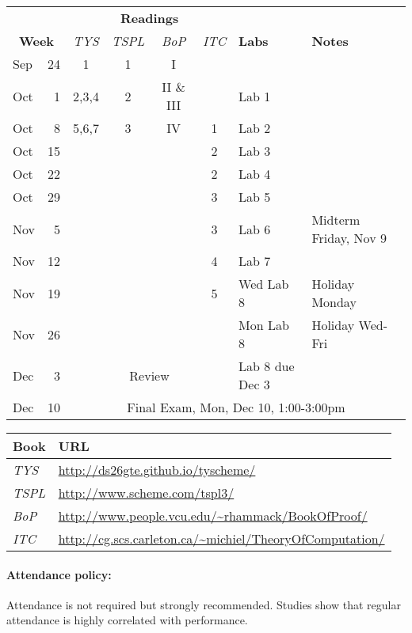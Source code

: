 \documentclass{article}
\begin{document}
  \begin{center}
\begin{tabular}{lr|cccc|l|l}                      
& & \multicolumn{4}{c|}{\bf Readings} &  \\
  \multicolumn{2}{c|}{\bf Week} &\em TYS & \em TSPL &\em BoP&\em ITC
& {\bf Labs}  & {\bf Notes} \\\hline  
Sep & 24  & 1 & 1 & I   & &  \\
Oct & 1 & 2,3,4 & 2 & II \& III &   &Lab 1 &\\
Oct & 8 & 5,6,7 & 3 & IV  & 1 & Lab 2&\\
Oct & 15 &  &   &    & 2 & Lab 3&\\
Oct & 22 &  &   &     & 2 & Lab 4&\\
Oct & 29 &  &   &     & 3 & Lab 5&\\
Nov & 5 &  &   &     & 3 & Lab 6 &Midterm Friday, Nov 9\\
Nov & 12 &  &   &     & 4 & Lab 7&\\
Nov & 19 &  &   &     & 5 & Wed Lab 8& Holiday Monday\\
Nov & 26 &  &  &      &  &Mon Lab 8& Holiday Wed-Fri \\                 
Dec & 3   &  \multicolumn{4}{c|}{Review}  &Lab 8 due Dec 3&\\ \hline
Dec & 10  &  \multicolumn{6}{|c}{Final Exam, Mon, Dec 10, 1:00-3:00pm} \\
\end{tabular}

\begin{tabular}{ll}
Book & URL\\\hline
{\em TYS} &       \url{http://ds26gte.github.io/tyscheme/} \\
{\em TSPL} & \url{http://www.scheme.com/tspl3/} \\
{\em BoP} & \url{http://www.people.vcu.edu/~rhammack/BookOfProof/}\\
{\em ITC} & \url{http://cg.scs.carleton.ca/~michiel/TheoryOfComputation/}\\
\end{tabular}

\end{center}

\paragraph{Attendance policy:} Attendance is not required but strongly
  recommended.  Studies show that regular attendance is highly
  correlated with performance.
\end{document}
